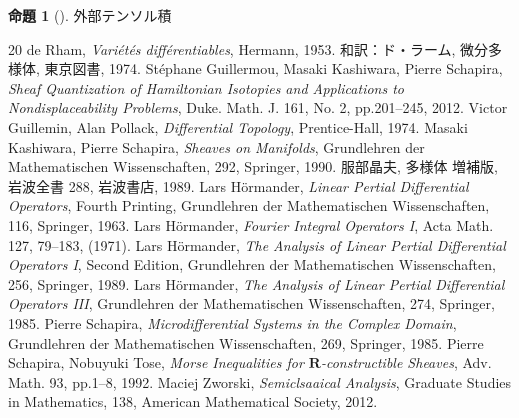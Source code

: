 \documentclass[leqno, 10pt, a4paper, dvipdfmx]{jsarticle}
\theoremstyle{definition}
\newcommand{\rr}{\mathbf{R}}
\numberwithin{equation}{section}
\theoremstyle{mystyle}
\newtheorem{PRP}[AXM]{命題}
\renewenvironment{leftbar}{%
  \def\FrameCommand{\textcolor{lightgray}{\vrule width 4pt} \hspace{10pt}}%
  \MakeFramed {\advance\hsize-\width \FrameRestore}}%
{\endMakeFramed}
\begin{document}
\begin{leftbar}
\begin{PRP}[{\cite[Prop.4.3.6.]{KS90}}]\label{prp4.3.6}
  外部テンソル積
\end{PRP}
\end{leftbar}














\begin{thebibliography}{20} 
  de Rham, \textit{Vari\'et\'es diff\'erentiables}, Hermann, 1953.
  和訳：ド・ラーム, 微分多様体, 東京図書, 1974.
   St\'ephane Guillermou, 
  Masaki Kashiwara, Pierre Schapira, 
  \textit{Sheaf Quantization of Hamiltonian Isotopies and Applications to Nondisplaceability Problems}, 
  Duke. Math. J. 161, No. 2, pp.201--245, 2012.  
   Victor Guillemin, Alan Pollack, 
    \textit{Differential Topology}, 
    Prentice-Hall, 1974.
   Masaki Kashiwara, Pierre Schapira, 
    \textit{Sheaves on Manifolds}, 
    Grundlehren der Mathematischen Wissenschaften, 292, Springer, 1990.
   服部晶夫, 多様体 増補版, 岩波全書 288, 岩波書店, 1989.
   Lars H\"ormander, 
  \textit{Linear Pertial Differential Operators}, Fourth Printing, 
  Grundlehren der Mathematischen Wissenschaften, 116, Springer, 1963.
   Lars H\"ormander, 
  \textit{Fourier Integral Operators I}, 
  Acta Math. 127, 79--183, (1971).
   Lars H\"ormander, 
  \textit{The Analysis of Linear Pertial Differential Operators I}, Second Edition,
  Grundlehren der Mathematischen Wissenschaften, 256, Springer, 1989.
   Lars H\"ormander, 
  \textit{The Analysis of Linear Pertial Differential Operators III}, 
  Grundlehren der Mathematischen Wissenschaften, 274, Springer, 1985.
   Pierre Schapira, 
    \textit{Microdifferential Systems in the Complex Domain}, 
    Grundlehren der Mathematischen Wissenschaften, 269, 
    Springer, 1985.
     Pierre Schapira, Nobuyuki Tose, 
    \textit{Morse Inequalities for \(\rr\)-constructible Sheaves}, 
    Adv. Math. 93, pp.1--8, 1992. 
     Maciej Zworski,
    \textit{Semiclsaaical Analysis}, 
    Graduate Studies in Mathematics, 138, 
    American Mathematical Society, 
    2012. 
\end{thebibliography}

\end{document}
